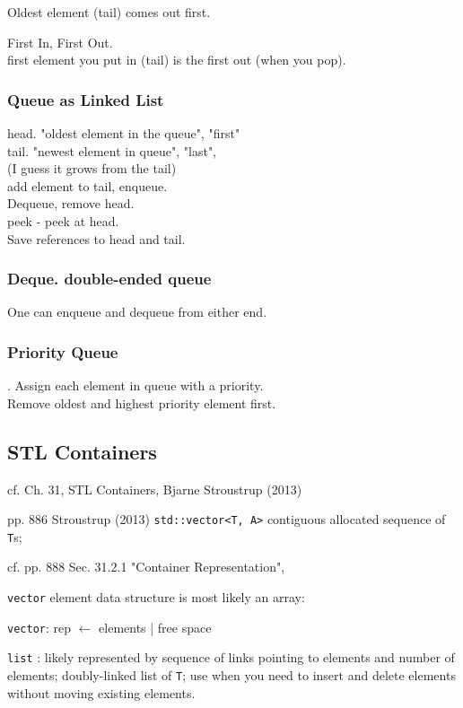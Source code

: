 \documentclass[10pt]{amsart}
\begin{document}
\begin{multicols*}{2}
Oldest element (tail) comes out first.

First In, First Out. \\
first element you put in (tail) is the first out (when you pop). \\

\subsubsection{Queue as Linked List}


head. "oldest element in the queue", "first" \\
tail. "newest element in queue", "last", \\
(I guess it grows from the tail) \\
add element to tail, enqueue. \\
Dequeue, remove head. \\
peek - peek at head. \\

Save references to head and tail.

\subsubsection{Deque. double-ended queue}

One can enqueue and dequeue from either end.

\subsubsection{Priority Queue}. 
Assign each element in queue with a priority. \\
Remove oldest and highest priority element first.

\subsection{STL Containers}

cf. Ch. 31, STL Containers, Bjarne Stroustrup (2013) \cite{Stro2013}

pp. 886 Stroustrup (2013) \cite{Stro2013}
\verb|std::vector<T, A>| contiguous allocated sequence of \verb|T|s;

cf. pp. 888 Sec. 31.2.1 "Container Representation", \cite{Stro2013}

\verb|vector| element data structure is most likely an array:

\verb|vector|: rep $\leftarrow$ elements | free space

\verb|list| : likely represented by sequence of links pointing to elements and number of elements; doubly-linked list of \verb|T|; use when you need to insert and delete elements without moving existing elements.


\end{multicols*}
\end{document}
